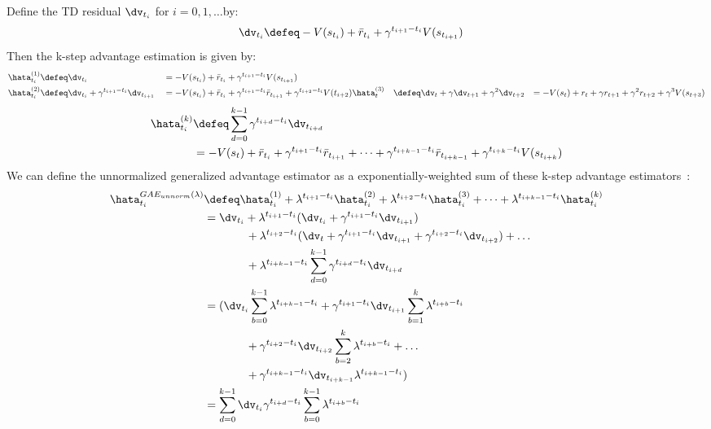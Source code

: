 Define the TD residual $\dv_{t_i}$ for $i=0,1, \dots$by:
\begin{align}
\dv_{t_i} & \defeq -V(s_{t_i}) + \bar{r}_{t_i} + \gamma^{t_{i+1}-t_i} V(s_{t_{i+1}})
\end{align}
Then the k-step advantage estimation is given by:
\begin{alignat}{2}
\hata_{t_i}^{(1)} & \defeq   \dv_{{t_i}} 
 &&=-V(s_{t_i}) + \bar{r}_{t_i} + \gamma^{t_{i+1}-t_i} V(s_{t_{i+1}})\\
\hata_{t_i}^{(2)} 
&\defeq \dv_{t_i} + \gamma^{t_{i+1}-t_i} \dv_{t_{i+1}} 
&&= -V(s_{t_i}) +\bar{r}_{t_i} + \gamma^{t_{i+1}-t_i} \bar{r}_{t_{i+1}} + \gamma^{t_{i+2}-t_i} V(t_{i+2}) 
\hata_t^{(3)} &\defeq \dv_{t} + \gamma \dv_{t+1} + \gamma^2 \dv_{t+2} &&= -V(s_t) + r_t + \gamma r_{t+1} + \gamma^2 r_{t+2} + \gamma^3 V(s_{t+3}) \label{a3}
\end{alignat}
\begin{align}
\begin{split}
\hata_{t_i}^{(k)} 
&\defeq \sum_{d=0}^{k-1} 
\gamma^{t_{i+d}-t_i} \dv_{t_{i+d}} \\
&= -V(s_t) 
+\bar{r}_{t_i} + \gamma^{t_{i+1}-t_i} \bar{r}_{t_{i+1}} 
+ \dots 
+ \gamma^{t_{i+k-1}-t_i} \bar{r}_{t_{i+k-1}} 
+ \gamma^{t_{i+k}-t_i} V(s_{t_{i+k}})
\end{split}
\end{align}
We can define the unnormalized generalized advantage estimator as a exponentially-weighted sum of these k-step advantage estimators~\cite{schulman2015high}:
\begin{align}
\hata_{t_i}^{GAE_{unnorm}(\lambda)}
&\defeq  \hata_{t_i}^{(1)} + \lambda^{t_{i+1}-t_i}  \hata_{t_i}^{(2)} + \lambda^{t_{i+2}-t_i} \hata_{t_i}^{(3)} + \dots + \lambda^{t_{i+k-1}-t_i} \hata_{t_i}^{(k)} \nonumber \\
&=  \dv_{t_i} 
+ \lambda^{t_{i+1}-t_i} (\dv_{t_i} + \gamma^{t_{i+1}-t_i} \dv_{t_{i+1}} ) \\
&\ \ \ \ \  \ \ \ \ \ \ +\lambda^{t_{i+2}-t_i} (\dv_t + \gamma^{t_{i+1}-t_i} \dv_{t_{i+1}} + \gamma^{t_{i+2}-t_i} \dv_{t_{i+2}}) + \dots \nonumber \\
&\ \ \ \ \  \ \ \ \ \ \ +\lambda^{t_{i+k-1}-t_i}  \sum_{d=0}^{k-1} \gamma^{t_{i+d}-t_i} \dv_{t_{i+d}}\\
&= (
\dv_{t_i}  \sum_{b=0}^{k-1} \lambda^{t_{i+k-1}-t_i}
+\gamma^{t_{i+1}-t_i} \dv_{t_{i+1}} \sum_{b=1}^k \lambda^{t_{i+b}-t_i} \nonumber \\
&\ \ \ \ \  \ \ \ \ \ \ +\gamma^{t_{i+2}-t_i} \dv_{t_{i+2}} \sum_{b=2}^k \lambda^{t_{i+b}-t_i}
+\dots \\
&\ \ \ \ \  \ \ \ \ \ \ +\gamma^{t_{i+k-1}-t_i} \dv_{t_{i+k-1}} \lambda^{t_{i+k-1}-t_i})
\nonumber \\
&= \sum_{d=0}^{k-1} \dv_{t_i} \gamma^{t_{i+d}-t_i} \sum_{b=0}^{k-1} \lambda^{t_{i+b}-t_i}
\label{eq:gaelam1}
\end{align}
